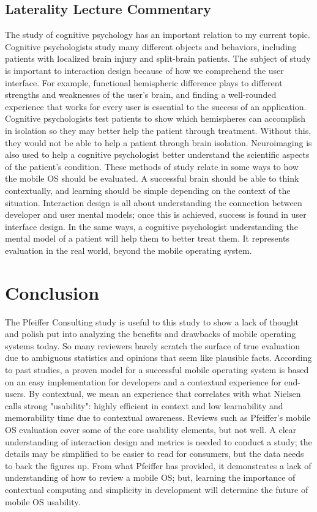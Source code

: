\documentclass[11pt]{article}
\begin{document}
\subsection{Laterality Lecture Commentary}
The study of cognitive psychology has an important relation to my current topic. Cognitive psychologists study many different objects and behaviors, including patients with localized brain injury and split-brain patients. The subject of study is important to interaction design because of how we comprehend the user interface. For example, functional hemispheric difference plays to different strengths and weaknesses of the user's brain, and finding a well-rounded experience that works for every user is essential to the success of an application. Cognitive psychologists test patients to show which hemispheres can accomplish in isolation so they may better help the patient through treatment. Without this, they would not be able to help a patient through brain isolation. Neuroimaging is also used to help a cognitive psychologist better understand the scientific aspects of the patient's condition. These methods of study relate in some ways to how the mobile OS should be evaluated. A successful brain should be able to think contextually, and learning should be simple depending on the context of the situation. Interaction design is all about understanding the connection between developer and user mental models; once this is achieved, success is found in user interface design. In the same ways, a cognitive psychologist understanding the mental model of a patient will help them to better treat them. It represents evaluation in the real world, beyond the mobile operating system.
\section{Conclusion}
The Pfeiffer Consulting study is useful to this study to show a lack of thought and polish put into analyzing the benefits and drawbacks of mobile operating systems today. So many reviewers barely scratch the surface of true evaluation due to ambiguous statistics and opinions that seem like plausible facts. According to past studies, a proven model for a successful mobile operating system is based on an easy implementation for developers and a contextual experience for end-users. By contextual, we mean an experience that correlates with what Nielsen calls strong "usability": highly efficient in context and low learnability and memorability time due to contextual awareness. Reviews such as Pfeiffer's mobile OS evaluation cover some of the core usability elements, but not well. A clear understanding of interaction design and metrics is needed to conduct a study; the details may be simplified to be easier to read for consumers, but the data needs to back the figures up. From what Pfeiffer has provided, it demonstrates a lack of understanding of how to review a mobile OS; but, learning the importance of contextual computing and simplicity in development will determine the future of mobile OS usability.


\end{document}

